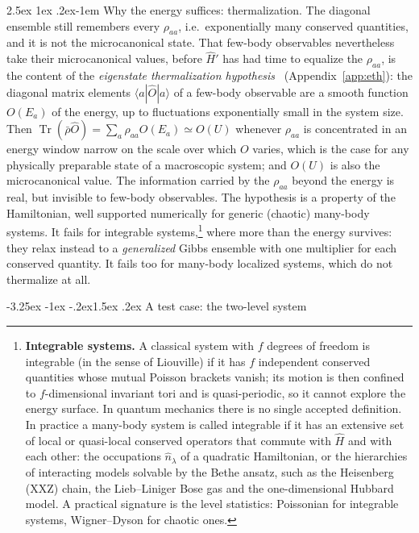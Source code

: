 \documentclass[10pt,a4paper]{article}
\makeatletter
\renewcommand{\subsection}{\@startsection{subsection}{2}{\z@}%
  {-3.25ex \@plus -1ex \@minus -.2ex}{1.5ex \@plus .2ex}%
  {\normalfont\fontsize{15.5pt}{19pt}\selectfont\bfseries}}
\renewcommand{\paragraph}{\@startsection{paragraph}{4}{\z@}%
  {2.5ex \@plus 1ex \@minus .2ex}{-1em}%
  {\normalfont\fontsize{14pt}{17pt}\selectfont\bfseries}}
\newcommand{\Tr}{\operatorname{Tr}}
\makeatother
\begin{document}
\paragraph{Why the energy suffices: thermalization.}
The diagonal ensemble still remembers every $ \rho_{aa} $, i.e.\ exponentially many conserved quantities, and it is not the microcanonical state.
That few-body observables nevertheless take their microcanonical values, before $ \hat H' $ has had time to equalize the $ \rho_{aa} $, is the content of the \emph{eigenstate thermalization hypothesis}~\cite{Deutsch1991,Srednicki1994} (Appendix~\ref{app:eth}): the diagonal matrix elements $ \langle a|\hat O|a\rangle $ of a few-body observable are a smooth function $ O(E_a) $ of the energy, up to fluctuations exponentially small in the system size.
Then $ \Tr(\bar\rho\hat O) = \sum_a\rho_{aa}O(E_a) \simeq O(U) $ whenever $ \rho_{aa} $ is concentrated in an energy window narrow on the scale over which $ O $ varies, which is the case for any physically preparable state of a macroscopic system; and $ O(U) $ is also the microcanonical value.
The information carried by the $ \rho_{aa} $ beyond the energy is real, but invisible to few-body observables.
The hypothesis is a property of the Hamiltonian, well supported numerically for generic (chaotic) many-body systems.
It fails for integrable systems,\footnote{\label{fn:integrable}\textbf{Integrable systems.}
A classical system with $ f $ degrees of freedom is integrable (in the sense of Liouville) if it has $ f $ independent conserved quantities whose mutual Poisson brackets vanish; its motion is then confined to $ f $-dimensional invariant tori and is quasi-periodic, so it cannot explore the energy surface.
In quantum mechanics there is no single accepted definition.
In practice a many-body system is called integrable if it has an extensive set of local or quasi-local conserved operators that commute with $ \hat H $ and with each other: the occupations $ \hat n_\lambda $ of a quadratic Hamiltonian, or the hierarchies of interacting models solvable by the Bethe ansatz, such as the Heisenberg (XXZ) chain, the Lieb--Liniger Bose gas and the one-dimensional Hubbard model.
A practical signature is the level statistics: Poissonian for integrable systems, Wigner--Dyson for chaotic ones.} where more than the energy survives: they relax instead to a \emph{generalized} Gibbs ensemble with one multiplier for each conserved quantity.
It fails too for many-body localized systems, which do not thermalize at all.

\subsection{A test case: the two-level system}
\label{sec:found_tls}
\end{document}
